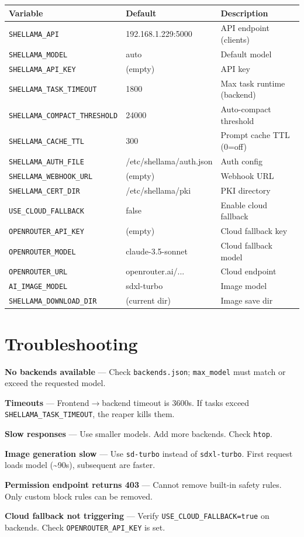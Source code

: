 \documentclass[11pt,a4paper]{article}
\begin{document}
\begin{longtable}{p{5.5cm}p{3.5cm}p{5cm}}
\toprule
\textbf{Variable} & \textbf{Default} & \textbf{Description} \\
\midrule
\texttt{SHELLAMA\_API} & 192.168.1.229:5000 & API endpoint (clients) \\
\texttt{SHELLAMA\_MODEL} & auto & Default model \\
\texttt{SHELLAMA\_API\_KEY} & (empty) & API key \\
\texttt{SHELLAMA\_TASK\_TIMEOUT} & 1800 & Max task runtime (backend) \\
\texttt{SHELLAMA\_COMPACT\_THRESHOLD} & 24000 & Auto-compact threshold \\
\texttt{SHELLAMA\_CACHE\_TTL} & 300 & Prompt cache TTL (0=off) \\
\texttt{SHELLAMA\_AUTH\_FILE} & /etc/shellama/auth.json & Auth config \\
\texttt{SHELLAMA\_WEBHOOK\_URL} & (empty) & Webhook URL \\
\texttt{SHELLAMA\_CERT\_DIR} & /etc/shellama/pki & PKI directory \\
\texttt{USE\_CLOUD\_FALLBACK} & false & Enable cloud fallback \\
\texttt{OPENROUTER\_API\_KEY} & (empty) & Cloud fallback key \\
\texttt{OPENROUTER\_MODEL} & claude-3.5-sonnet & Cloud fallback model \\
\texttt{OPENROUTER\_URL} & openrouter.ai/... & Cloud endpoint \\
\texttt{AI\_IMAGE\_MODEL} & sdxl-turbo & Image model \\
\texttt{SHELLAMA\_DOWNLOAD\_DIR} & (current dir) & Image save dir \\
\bottomrule
\end{longtable}

\section{Troubleshooting}

\textbf{No backends available} --- Check \texttt{backends.json}; \texttt{max\_model} must match or exceed the requested model.

\textbf{Timeouts} --- Frontend$\rightarrow$backend timeout is 3600s. If tasks exceed \texttt{SHELLAMA\_TASK\_TIMEOUT}, the reaper kills them.

\textbf{Slow responses} --- Use smaller models. Add more backends. Check \texttt{htop}.

\textbf{Image generation slow} --- Use \texttt{sd-turbo} instead of \texttt{sdxl-turbo}. First request loads model (\~{}90s), subsequent are faster.

\textbf{Permission endpoint returns 403} --- Cannot remove built-in safety rules. Only custom block rules can be removed.

\textbf{Cloud fallback not triggering} --- Verify \texttt{USE\_CLOUD\_FALLBACK=true} on backends. Check \texttt{OPENROUTER\_API\_KEY} is set.
\end{document}
